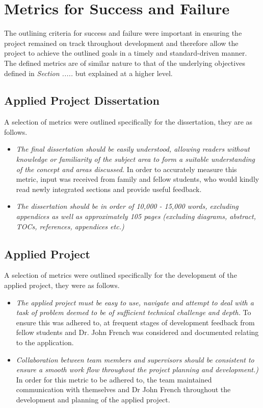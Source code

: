 \section{Metrics for Success and Failure}
The outlining criteria for success and failure were important in ensuring the project remained on track throughout development and therefore allow the project to achieve the outlined goals in a timely and standard-driven manner. The defined metrics are of similar nature to that of the underlying objectives defined in \emph{Section .....} but explained at a higher level.

\vspace{5mm} %

\subsection{Applied Project Dissertation}
A selection of metrics were outlined specifically for the dissertation, they are as follows.

\begin{itemize}

    \item \emph{The final dissertation should be easily understood, allowing readers without knowledge or familiarity of the subject area to form a suitable understanding of the concept and areas discussed.} In order to accurately measure this metric, input was received from family and fellow students, who would kindly read newly integrated sections and provide useful feedback.

    \item \emph{The  dissertation should be in order of 10,000 - 15,000 words, excluding appendices as well as approximately 105 pages (excluding diagrams, abstract, TOCs, references, appendices etc.)}

\end{itemize}

\subsection{Applied Project}
A selection of metrics were outlined specifically for the development of the applied project, they were as follows.

\begin{itemize}

    \item \emph{The applied project must be easy to use, navigate and attempt to deal with a task of problem deemed to be of sufficient technical challenge and depth.} To ensure this was adhered to, at frequent stages of development feedback from fellow students and Dr. John French was considered and documented relating to the application.

    \item \emph{Collaboration between team members and supervisors should be consistent to ensure a smooth work flow throughout the project planning and development.)} In order for this metric to be adhered to, the team maintained communication with themselves and Dr John French throughout the development and planning of the applied project.

\end{itemize}

